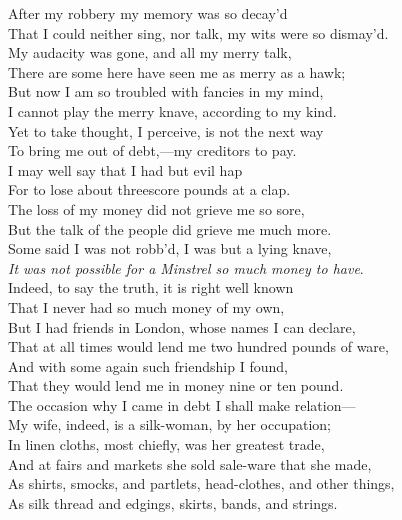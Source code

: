 \begin{scverse}
After my robbery my memory was so decay’d\\
That I could neither sing, nor talk, my wits were so dismay’d.\\
My audacity was gone, and all my merry talk,\\
There are some here have seen me as merry as a hawk;\\
But now I am so troubled with fancies in my mind,\\
I cannot play the merry knave, according to my kind.\\
Yet to take thought, I perceive, is not the next way\\
To bring me out of debt,—my creditors to pay.\\
I may well say that I had but evil hap\\
For to lose about threescore pounds at a clap.\\
The loss of my money did not grieve me so sore,\\
But the talk of the people did grieve me much more.\\
Some said I was not robb’d, I was but a lying knave,\\
\textit{It was not possible for a Minstrel so much money to have}.\\
Indeed, to say the truth, it is right well known\\
That I never had so much money of my own,\\
But I had friends in London, whose names I can declare,\\
That at all times would lend me two hundred pounds of ware,\\
And with some again such friendship I found,\\
That they would lend me in money nine or ten pound.\\
The occasion why I came in debt I shall make relation—\\
My wife, indeed, is a silk-woman, by her occupation;\\
In linen cloths, most chiefly, was her greatest trade,\\
And at fairs and markets she sold sale-ware that she made,\\
As shirts, smocks, and partlets, head-clothes, and other things,\\
As silk thread and edgings, skirts, bands, and strings.\\

\end{scverse}
